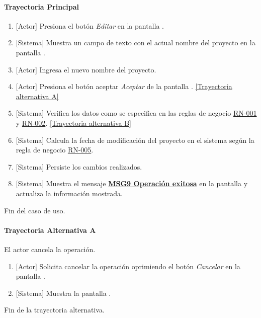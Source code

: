 \paragraph{Trayectoria Principal}
\label{W-PR-CU1.1.1}
	\begin{enumerate}
	    \item {[Actor]} Presiona el botón \textit{Editar} en la pantalla \textbf{}.
	    
	    \item {[Sistema]} Muestra un campo de texto con el actual nombre del proyecto en la pantalla \textbf{}.
	    
	    \item {[Actor]} Ingresa el nuevo nombre del proyecto.
	    
	    \item {[Actor]} Presiona el botón aceptar \textit{Aceptar} de la pantalla \textbf{}.  \hyperref[W-PR-CU1.1.1:TA]{[Trayectoria alternativa A]}
	    
	    \item {[Sistema]} Verifica los datos como se especifica en las reglas de negocio \hyperref[RN001]{RN-001} y \hyperref[RN002]{RN-002}. \hyperref[W-PR-CU1.1.1:TB]{[Trayectoria alternativa B]}
	    
	    \item {[Sistema]} Calcula la fecha de modificación del proyecto en el sistema según la regla de negocio \hyperref[RN005]{RN-005}.
	    
	    \item {[Sistema]} Persiste los cambios realizados.
	    
	    \item {[Sistema]} Muestra el mensaje \hyperref[MSG9]{\bf MSG9 Operación exitosa} en la pantalla \textbf{}y actualiza la información mostrada. 

	\end{enumerate}
	Fin del caso de uso.
	
\paragraph{Trayectoria Alternativa A} \label{W-PR-CU1.1.1:TA}
	El actor cancela la operación.
	\begin{enumerate}[label=A\arabic*.]
		\item {[Actor]} Solicita cancelar la operación oprimiendo el botón \textit{Cancelar} en la pantalla \textbf{}.
		\item {[Sistema]} Muestra la pantalla \textbf{}.
	\end{enumerate}
	Fin de la trayectoria alternativa.

